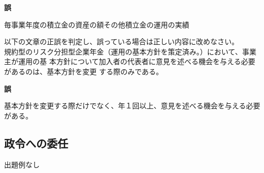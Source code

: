\begin{answerbox}
  \textbf{誤}

  毎事業年度の積立金の資産の額その他積立金の運用の実績
\end{answerbox}

\begin{truefalse}[年金1 H29 問題2(1)\textcircled{4}]
  以下の文章の正誤を判定し、誤っている場合は正しい内容に改めなさい。
  \\

  規約型のリスク分担型企業年金（運用の基本方針を策定済み。）において、事業主が運用の基
本方針について加入者の代表者に意見を述べる機会を与える必要があるのは、基本方針を変更
する際のみである。
\end{truefalse}

\begin{answerbox}
  \textbf{誤}

  基本方針を変更する際だけでなく、年１回以上、意見を述べる機会を与える必要がある。
\end{answerbox}

\newpage

\subsection{政令への委任}

出題例なし

\newpage